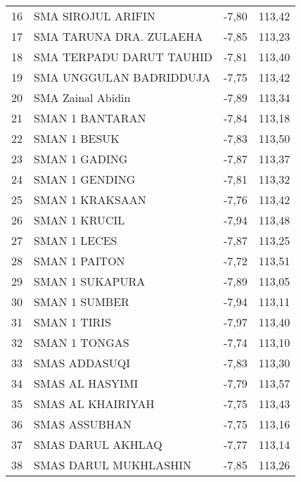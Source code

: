 {\begin{longtable}[c]{clll}
16 & SMA   SIROJUL ARIFIN                  & -7,80 & 113,42 \\
\rowcolor[HTML]{D9E1F2} 
17 & SMA TARUNA DRA. ZULAEHA               & -7,85 & 113,23 \\
18 & SMA   TERPADU DARUT TAUHID            & -7,81 & 113,40 \\
\rowcolor[HTML]{D9E1F2} 
19 & SMA UNGGULAN BADRIDDUJA               & -7,75 & 113,42 \\
20 & SMA   Zainal Abidin                   & -7,89 & 113,34 \\
\rowcolor[HTML]{D9E1F2} 
21 & SMAN 1 BANTARAN                       & -7,84 & 113,18 \\
22 & SMAN 1   BESUK                        & -7,83 & 113,50 \\
\rowcolor[HTML]{D9E1F2} 
23 & SMAN 1 GADING                         & -7,87 & 113,37 \\
24 & SMAN 1   GENDING                      & -7,81 & 113,32 \\
\rowcolor[HTML]{D9E1F2} 
25 & SMAN 1 KRAKSAAN                       & -7,76 & 113,42 \\
26 & SMAN 1   KRUCIL                       & -7,94 & 113,48 \\
\rowcolor[HTML]{D9E1F2} 
27 & SMAN 1 LECES                          & -7,87 & 113,25 \\
28 & SMAN 1   PAITON                       & -7,72 & 113,51 \\
\rowcolor[HTML]{D9E1F2} 
29 & SMAN 1 SUKAPURA                       & -7,89 & 113,05 \\
30 & SMAN 1   SUMBER                       & -7,94 & 113,11 \\
\rowcolor[HTML]{D9E1F2} 
31 & SMAN 1 TIRIS                          & -7,97 & 113,40 \\
32 & SMAN 1   TONGAS                       & -7,74 & 113,10 \\
\rowcolor[HTML]{D9E1F2} 
33 & SMAS ADDASUQI                         & -7,83 & 113,30 \\
34 & SMAS AL   HASYIMI                     & -7,79 & 113,57 \\
\rowcolor[HTML]{D9E1F2} 
35 & SMAS AL KHAIRIYAH                     & -7,75 & 113,43 \\
36 & SMAS   ASSUBHAN                       & -7,75 & 113,16 \\
\rowcolor[HTML]{D9E1F2} 
37 & SMAS DARUL AKHLAQ                     & -7,77 & 113,14 \\
38 & SMAS   DARUL MUKHLASHIN               & -7,85 & 113,26 \\

\end{longtable}}
